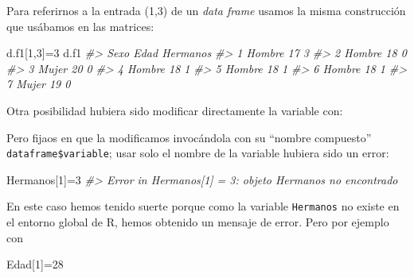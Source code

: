 \documentclass[
]{book}
\newenvironment{Shaded}{\begin{snugshade}}{\end{snugshade}}
\newcommand{\CommentTok}[1]{\textcolor[rgb]{0.56,0.35,0.01}{\textit{#1}}}
\newcommand{\DecValTok}[1]{\textcolor[rgb]{0.00,0.00,0.81}{#1}}
\newcommand{\NormalTok}[1]{#1}
\newcommand{\OperatorTok}[1]{\textcolor[rgb]{0.81,0.36,0.00}{\textbf{#1}}}
\theoremstyle{definition}
\theoremstyle{definition}
\theoremstyle{definition}
\theoremstyle{remark}
\begin{document}
Para referirnos a la entrada (1,3) de un \emph{data frame} usamos la misma construcción que usábamos en las matrices:

\begin{Shaded}
\begin{Highlighting}[]
\NormalTok{d.f1[}\DecValTok{1}\NormalTok{,}\DecValTok{3}\NormalTok{]=}\DecValTok{3}
\NormalTok{d.f1}
\CommentTok{\#\textgreater{}     Sexo Edad Hermanos}
\CommentTok{\#\textgreater{} 1 Hombre   17        3}
\CommentTok{\#\textgreater{} 2 Hombre   18        0}
\CommentTok{\#\textgreater{} 3  Mujer   20        0}
\CommentTok{\#\textgreater{} 4 Hombre   18        1}
\CommentTok{\#\textgreater{} 5 Hombre   18        1}
\CommentTok{\#\textgreater{} 6 Hombre   18        1}
\CommentTok{\#\textgreater{} 7  Mujer   19        0}
\end{Highlighting}
\end{Shaded}

Otra posibilidad hubiera sido modificar directamente la variable con:

\begin{Shaded}
\end{Shaded}

Pero fijaos en que la modificamos invocándola con su ``nombre compuesto'' \texttt{dataframe\$variable}; usar solo el nombre de la variable hubiera sido un error:

\begin{Shaded}
\begin{Highlighting}[]
\NormalTok{Hermanos[}\DecValTok{1}\NormalTok{]=}\DecValTok{3}
\CommentTok{\#\textgreater{} Error in Hermanos[1] = 3: objeto \textquotesingle{}Hermanos\textquotesingle{} no encontrado}
\end{Highlighting}
\end{Shaded}

En este caso hemos tenido suerte porque como la variable \texttt{Hermanos} no existe en el entorno global de R, hemos obtenido un mensaje de error. Pero por ejemplo con

\begin{Shaded}
\begin{Highlighting}[]
\NormalTok{Edad[}\DecValTok{1}\NormalTok{]=}\DecValTok{28}
\end{Highlighting}
\end{Shaded}
\end{document}
